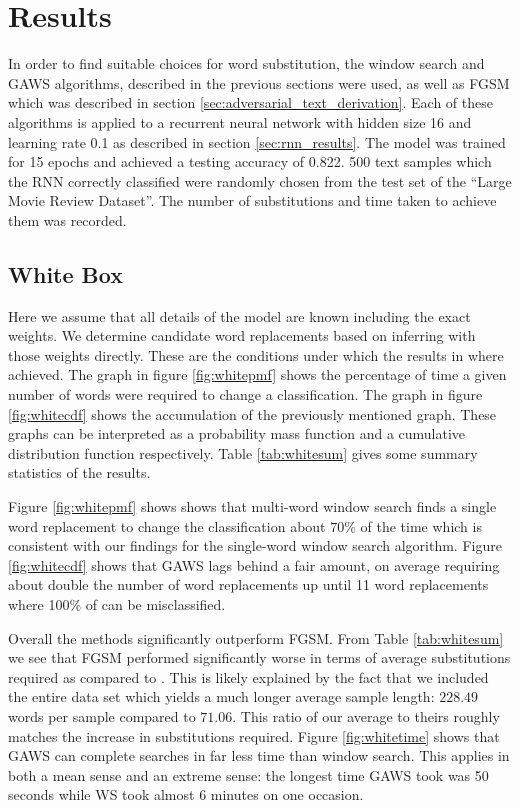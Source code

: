 \chapter{Results}\label{chap:results}
In order to find suitable choices for word substitution, the window search and GAWS algorithms, described in the previous sections were used, as well as FGSM which was described in section \ref{sec:adversarial_text_derivation}.  Each of these algorithms is applied to a recurrent neural network with hidden size 16 and learning rate 0.1 as described in section \ref{sec:rnn_results}.  The model was trained for 15 epochs and achieved a testing accuracy of 0.822.  500 text samples which the RNN correctly classified were randomly chosen from the test set of the ``Large Movie Review Dataset''.  The number of substitutions and time taken to achieve them was recorded.


\section{White Box}
Here we assume that all details of the model are known including the exact weights.  We determine candidate word replacements based on inferring with those weights directly.  These are the conditions under which the results in \cite{np16} where achieved.  The graph in figure \ref{fig:whitepmf} shows the percentage of time a given number of words were required to change a classification.  The graph in figure \ref{fig:whitecdf} shows the accumulation of the previously mentioned graph.  These graphs can be interpreted as a probability mass function and a cumulative distribution function respectively.  Table \ref{tab:whitesum} gives some summary statistics of the results.

Figure \ref{fig:whitepmf} shows shows that multi-word window search finds a single word replacement to change the classification about $70\%$ of the time which is consistent with our findings for the single-word window search algorithm.  Figure \ref{fig:whitecdf} shows that GAWS lags behind a fair amount, on average requiring about double the number of word replacements up until 11 word replacements where 100\% of can be misclassified.  

Overall the methods significantly outperform FGSM.  From Table \ref{tab:whitesum} we see that FGSM performed significantly worse in terms of average substitutions required as compared to \cite{np16}.  This is likely explained by the fact that we included the entire data set which yields a much longer average sample length: $228.49$ words per sample compared to $71.06$.  This ratio of our average to theirs roughly matches the increase in substitutions required.  Figure \ref{fig:whitetime} shows that GAWS can complete searches in far less time than window search.  This applies in both a mean sense and an extreme sense: the longest time GAWS took was 50 seconds while WS took almost 6 minutes on one occasion.

